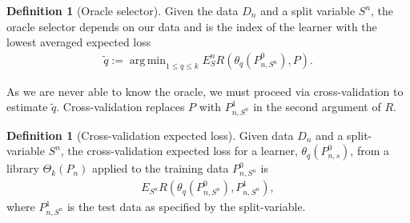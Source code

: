 \documentclass[11pt, a4paper]{article}
\DeclareMathOperator*{\argmin}{arg\,min}
\theoremstyle{definition}
\newtheorem{definition}[theorem]{Definition}
\theoremstyle{remark}
\newcommand{\q}{q}
\newcommand{\ml}{k}
\newcommand{\btheta}{\theta}
\newcommand{\Sn}{S^n}
\newcommand{\lib}{\Theta}
\begin{document}
\begin{definition}[Oracle selector]
    Given the data $ D_n $ and a split variable $ \Sn $, the oracle selector depends on our data and is the index of the learner with the lowest averaged expected loss 
    \begin{align*}
        \tilde{\q} := \argmin_{1 \leq \q \leq \ml} E_\Sn R( \btheta _\q (P_{n,\Sn}^0 ) , P).
    \end{align*}
\end{definition}
As we are never able to know the oracle, we must proceed via cross-validation to estimate $ \tilde{q}  $. Cross-validation replaces $ P $ with $ P_{n, \Sn}^{1} $ in the second argument of $ R $.
\begin{definition}[Cross-validation expected loss] Given data $D_n$ and a split-variable $\Sn$, the cross-validation expected loss for a learner, $\theta_q(P_{n,s}^0)$, from a library $\lib_{\ml}(P_n)$ applied to the training data $P_{n,\Sn}^0$ is
    \begin{align*}
        E_{\Sn} R( \btheta_\q(P_{n,\Sn}^{0}), P_{n, \Sn}^{1}),
    \end{align*}
    where $ P_{n,\Sn}^{1} $ is the test data as specified by the split-variable.
\end{definition}
\end{document}
